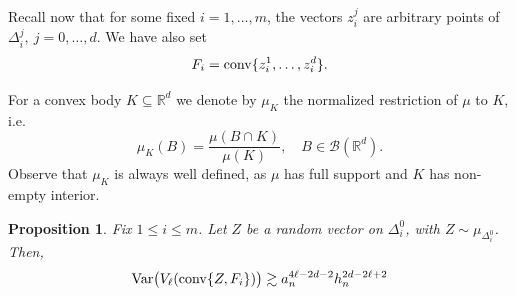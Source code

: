 \documentclass[10pt]{amsart}
\newcommand{\1}{\textbf{1}}
\newcommand{\conv}{{\rm conv}}
\newcommand{\Var}{{\rm Var}}
\numberwithin{equation}{section} %
\newtheorem{proposition}[theorem]{Proposition}
\theoremstyle{remark}
\theoremstyle{definition}
\begin{document}
Recall now that for some fixed $i=1,\ldots,m$, the vectors $z_i^j$ are arbitrary points of $\Delta_i^j, \ j=0,\ldots,d$. We have also set \[F_i =\conv\{z_i^1,\ldots,z_i^d\}.\] 

For a convex body $K \subseteq \mathbb{R}^d$ we denote by $\mu_K$ the normalized restriction of $\mu$ to $K$, i.e. \[\mu_K(B)=\frac{\mu(B \cap K)}{\mu(K)}, \quad B \in \mathcal{B}(\mathbb{R}^d).\] Observe that $\mu_K$ is always well defined, as $\mu$ has full support and $K$ has non-empty interior.

\begin{proposition}\label{prop:variance-lower-bound}
    Fix  $1 \leq i \leq m$. Let $Z$ be a random vector on $\Delta_i^0$, with $Z \sim \mu_{\Delta_i^0}$. Then, \[\Var \bigl(V_\ell(\conv\{Z,F_i\})\bigr) \gtrsim a_n^{4\ell-2d-2}h_n^{2d-2\ell+2}\]
\end{proposition}
\end{document}
